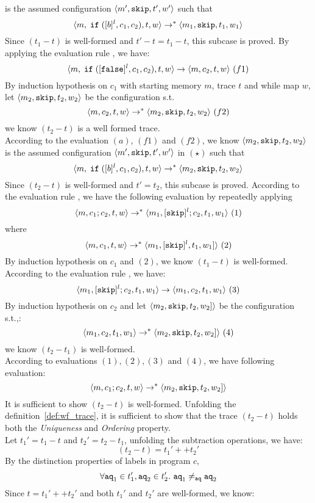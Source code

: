 is the assumed configuration $\langle m', \mathtt{skip}, t', w' \rangle$ such that
\[
	\langle m, \;\mathtt{if}\;([b]^l, c_1, c_2), t, w \rangle \to^{*} \langle m_1, \mathtt{skip}, t_1, w_1 \rangle
\]
%
Since $(t_1 - t)$ is well-formed and $t' - t = t_1 - t$, this subcase is proved.
%
%
By applying the evaluation rule , we have:
\[
\langle m, \;\mathtt{if}\;([\mathtt{false}]^l, c_1, c_2), t, w \rangle \to \langle m, c_2, t, w \rangle ~ (f1)
\]
%
By induction hypothesis on $c_1$ with starting memory $m$, trace $t$ and while map $w$, 
let $\langle m_2, \mathtt{skip}, t_2, w_2 \rangle$ be the configuration s.t.
\[
	\langle m, c_2, t, w \rangle \to^{*} \langle m_2, \mathtt{skip}, t_2, w_2 \rangle ~(f2)
\]
we know $(t_2 - t)$ is a well formed trace.
\\
According to the evaluation $(a)$, $(f1)$ and $(f2)$, we know $\langle m_2, \mathtt{skip}, t_2, w_2 \rangle$ 
is the assumed configuration $\langle m', \mathtt{skip}, t', w' \rangle$ in $(\star)$ such that
\[
	\langle m, \;\mathtt{if}\;([b]^l, c_1, c_2), t, w \rangle \to^{*} \langle m_2, \mathtt{skip}, t_2, w_2 \rangle
\]
%
Since $(t_2 - t)$ is well-formed and $t' = t_2$, this subcase is proved.
%
%
According to the evaluation rule , we have the following evaluation by repeatedly applying  
%
\[
\langle m, c_1;c_2, t, w \rangle \to^{*} \langle m_1, [\mathtt{skip}]^l;c_2,  t_1, w_1 \rangle ~ (1)
\]
%
where 
%
\[
	\langle m, c_1, t, w \rangle \to^{*} \langle m_1, [\mathtt{skip}]^l, t_1, w_1] \rangle ~ (2)
\]
%
%
By induction hypothesis on $c_1$ and $(2)$, we know $(t_1 - t)$ is well-formed.
%
According to the evaluation rule , we have:
%
\[
\langle m_1, [\mathtt{skip}]^l;c_2,  t_1, w_1 \rangle \to \langle m_1, c_2, t_1, w_1 \rangle ~ (3)
\]
%   
%
By induction hypothesis on $c_2$ and let $\langle m_2, \mathtt{skip}, t_2, w_2] \rangle$ be the configuration s.t.,:
%
\[
	\langle m_1, c_2, t_1, w_1 \rangle \to^{*} \langle m_2, \mathtt{skip}, t_2, w_2] \rangle ~ (4)
\]
%
we know $(t_2 - t_1)$ is well-formed.
%
\\
According to evaluations $(1), (2), (3)$ and $(4)$, we have following evaluation:
%
\[
	\langle m, c_1;c_2, t, w \rangle \to^{*} \langle m_2, \mathtt{skip}, t_2, w_2] \rangle
\]
%
It is sufficient to show $(t_2 - t)$ is well-formed.
%
Unfolding the definition~\ref{def:wf_trace}, it is sufficient to show that the trace $(t_2 - t)$ holds both the \emph{Uniqueness} and \emph{Ordering} property.
\\
Let $t_1' = t_1 - t$ and $t_2' = t_2 - t_1$, unfolding the subtraction operations, we have:
\[
	(t_2 - t) = t_1' ++ t_2'
\]
%
%
By the distinction properties of labels in program $c$, 
\[
	\forall \mathtt{aq}_1 \in t_1', \mathtt{aq}_2 \in t_2'. ~ \mathtt{aq}_1 \neq_{\mathtt{aq}} \mathtt{aq}_2
\] 
%
Since $t = t_1' ++ t_2'$ and both $t_1'$ and $t_2'$ are well-formed, we know:
